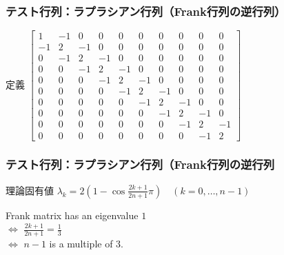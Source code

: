 \begin{frame}[c,fragile]
  \frametitle{テスト行列：ラプラシアン行列（Frank行列の逆行列）}
\begin{block}{定義}
$\begin{bmatrix}
1 &   -1  & 0 & 0 & 0 & 0 & 0 & 0 & 0 & 0 \\
-1 & 2 & -1 & 0 & 0 & 0 & 0 & 0 & 0 & 0 \\
0 & -1 & 2 & -1 & 0 & 0 & 0 & 0 & 0 & 0 \\
0 & 0 & -1 & 2 & -1 & 0 & 0 & 0 & 0 & 0 \\
0 & 0 & 0 & -1 & 2 & -1 & 0 & 0 & 0 & 0 \\
0 & 0 & 0 & 0 & -1 & 2 & -1 & 0 & 0 & 0 \\
0 & 0 & 0 & 0 & 0 & -1 & 2 & -1 & 0 & 0 \\
0 & 0 & 0 & 0 & 0 & 0 & -1 & 2 & -1 & 0 \\
0 & 0 & 0 & 0 & 0 & 0 & 0 & -1 & 2 & -1 \\
0 & 0 & 0 & 0 & 0 & 0 & 0 & 0 & -1 & 2
\end{bmatrix}$
\end{block}

\end{frame}

\begin{frame}[c,fragile]
  \frametitle{テスト行列：ラプラシアン行列（Frank行列の逆行列}
\begin{block}{理論固有値}%
$\lambda_k = 2 \left( 1 - \cos{\tfrac{2 k + 1}{2 n + 1}\pi} \right) \quad (k=0,\dots,n-1)$
\end{block}

\begin{block}{}%
Frank matrix has an eigenvalue $1$\\
\quad $\Longleftrightarrow$ $\tfrac{2 k + 1}{2 n + 1} = \tfrac{1}{3}$\\
\quad $\Longleftrightarrow$ $n-1$ is a multiple of 3.
\end{block}
\end{frame}

